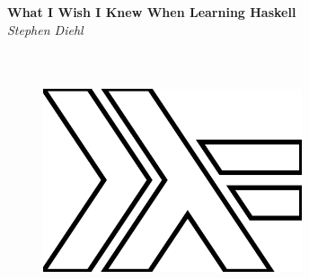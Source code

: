 \begin{titlepage}
  \pagecolor{white}

  \begin{center}
     \Huge\textbf{What I Wish I Knew When Learning Haskell}\\
     \Large\textit{Stephen Diehl}
  \end{center}

  \begin{figure}
      \centering
      \includegraphics[height=3in,width=3in]{img/cover.ps}
  \end{figure}

\end{titlepage}
\pagecolor{white}
